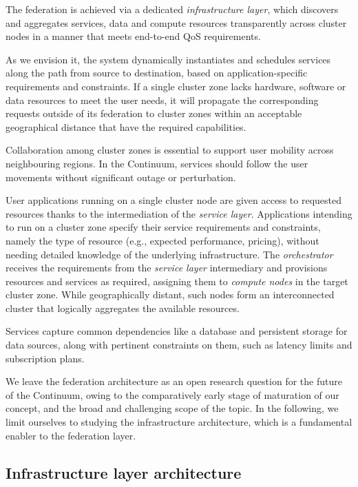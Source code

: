 The federation is achieved via a dedicated \textit{infrastructure layer}, which discovers and aggregates services, data and compute resources transparently across cluster nodes in a manner that meets end-to-end QoS requirements.

As we envision it, the system dynamically instantiates and schedules services along the path from source to destination, based on application-specific requirements and constraints. 
If a single cluster zone lacks hardware, software or data resources to meet the user needs, it will propagate the corresponding requests outside of its federation to cluster zones within an acceptable geographical distance that have the required capabilities.

Collaboration among cluster zones is essential to support user mobility across neighbouring regions. 
In the Continuum, services should follow the user movements without significant outage or perturbation.

User applications running on a single cluster node are given access to requested resources thanks to the intermediation of the \textit{service layer}. Applications intending to run on a cluster zone specify their service requirements and constraints, namely the type of resource (e.g., expected performance, pricing), without needing detailed knowledge of the underlying infrastructure. 
The \textit{orchestrator} receives the requirements from the \textit{service layer} intermediary and provisions resources and services as required, assigning them to \textit{compute nodes} in the target cluster zone.
While geographically distant, such nodes form an interconnected cluster that logically aggregates the available resources.

Services capture common dependencies like a database and persistent storage for data sources, along with pertinent constraints on them, such as latency limits and subscription plans.

We leave the federation architecture as an open research question for the future of the Continuum, owing to the comparatively early stage of maturation of our concept, and the broad and challenging scope of the topic. 
In the following, we limit ourselves to studying the infrastructure architecture, which is a fundamental enabler to the federation layer.

\subsection{Infrastructure layer architecture}

